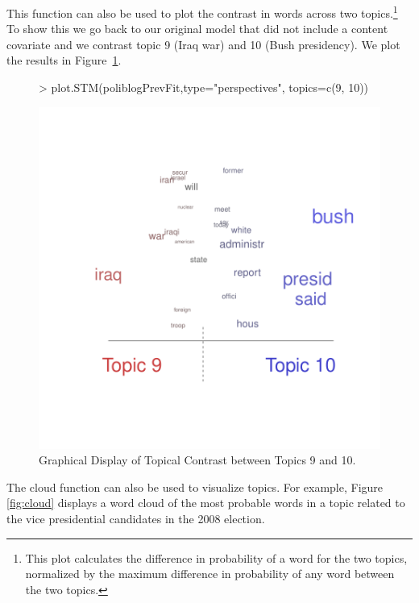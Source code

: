 \documentclass[nojss]{jss}
\begin{document}
This function can also be used to plot the contrast in words across two topics.\footnote{This plot calculates the difference in probability of a word for the two topics, normalized by the maximum difference in probability of any word between the two topics.} To show this we go back to our original model that did not include a content covariate and we contrast topic 9 (Iraq war) and 10 (Bush presidency). We plot the results in Figure~\ref{fig:perp2}.

\begin{figure}[t!]
\begin{center}
\begin{Schunk}
\begin{Sinput}
> plot.STM(poliblogPrevFit,type="perspectives", topics=c(9, 10))
\end{Sinput}
\end{Schunk}
\includegraphics{stmVignette-019}
\caption{Graphical Display of Topical Contrast between Topics 9 and 10.}
\label{fig:perp2}
\end{center}
\end{figure}

The cloud function can also be used to visualize topics.  For example, Figure \ref{fig:cloud} displays a word cloud of the most probable words in a topic related to the vice presidential candidates in the 2008 election.
\end{document}
